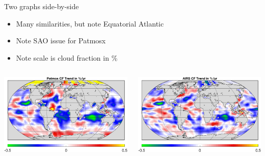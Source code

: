 \documentclass[10pt,t]{beamer}
\begin{document}
\begin{frame}[label={sec:org6e6f3d0}]{Two graphs side-by-side}
\begin{itemize}
\item Many similarities, but note Equatorial Atlantic
\item Note SAO issue for Patmosx
\item Note scale is cloud fraction in \%
\end{itemize}

\begin{columns}
\begin{column}{0.55\columnwidth}
\begin{block}{}
\begin{center}
\includegraphics[width=\linewidth]{./Figs/patmos_cf_rate_smooth.png}
\end{center}
\end{block}
\end{column}


\begin{column}{0.55\columnwidth}
\begin{block}{}
\begin{center}
\includegraphics[width=\linewidth]{./Figs/airs_cf_rate_smooth.png}
\end{center}
\end{block}
\end{column}
\end{columns}
\end{frame}
\end{document}
